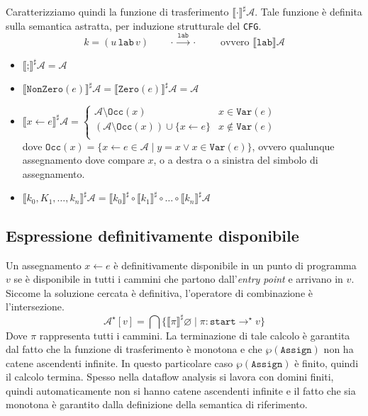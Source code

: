 Caratterizziamo quindi la funzione di trasferimento $\llbracket \cdot \rrbracket^\sharp\mathcal{A}$. 
Tale funzione è definita sulla semantica astratta, 
per induzione strutturale del \texttt{CFG}.
\[
  k = (u\, \texttt{lab}\, v)  \qquad \cdot \stackrel{\texttt{lab}}{\longrightarrow} \cdot \qquad
  \text{ ovvero }\llbracket \texttt{lab} \rrbracket \mathcal{A}
\]
\begin{itemize}
    \item $\llbracket\texttt{;} \rrbracket^\sharp \mathcal{A} = \mathcal{A}$
    \item $\llbracket \texttt{NonZero}(e) \rrbracket^\sharp \mathcal{A} = 
    \llbracket \texttt{Zero}(e) \rrbracket^\sharp \mathcal{A}
    = \mathcal{A}$
    \item $\llbracket x \gets e \rrbracket^\sharp \mathcal{A} = 
    \begin{cases}
        \mathcal{A} \setminus \texttt{Occ}(x) & x \in \texttt{Var}(e)\\
        (\mathcal{A} \setminus \texttt{Occ}(x)) \cup \{x \gets e\} & x \notin \texttt{Var}(e)\\
    \end{cases}$
    \\
    dove $\texttt{Occ}(x) = \{x \gets e \in \mathcal{A} \mid y = x \lor x \in \texttt{Var}(e)\}$, ovvero qualunque
    assegnamento dove compare $x$, o a destra o a sinistra del simbolo di assegnamento.
    \item $\llbracket k_0,K_1,\dots,k_n \rrbracket^\sharp \mathcal{A} = 
    \llbracket k_0 \rrbracket^\sharp \circ \llbracket k_1 \rrbracket^\sharp \circ \dots \circ \llbracket k_n \rrbracket^\sharp \mathcal{A}$
\end{itemize}

\subsection{Espressione definitivamente disponibile}
Un assegnamento $x \gets e$ è definitivamente disponibile in un punto di programma $v$ se è 
disponibile in tutti i cammini che partono dall'\textit{entry point} e arrivano in $v$. Siccome
la soluzione cercata è definitiva, l'operatore di combinazione è l'intersezione.
\begin{equation}
    \mathcal{A}^\star[v] = \bigcap \{ \llbracket \pi \rrbracket^\sharp \varnothing \mid 
    \pi : \texttt{start} \longrightarrow^\star v \} 
\end{equation}
Dove $\pi$ rappresenta tutti i cammini. La terminazione di tale calcolo è garantita dal fatto che 
la funzione di trasferimento è monotona e che $\wp(\texttt{Assign})$ non ha catene ascendenti infinite.
In questo particolare caso $\wp(\texttt{Assign})$ è finito, quindi il calcolo termina. Spesso nella 
dataflow analysis si lavora con domini finiti, quindi automaticamente non si hanno catene ascendenti infinite e 
il fatto che sia monotona è garantito dalla definizione della semantica di riferimento.


